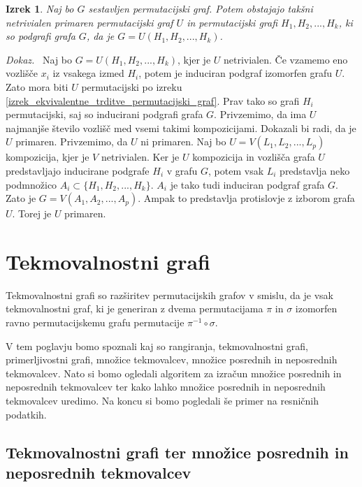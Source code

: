 \documentclass[a4paper, 12pt]{book}
\newtheorem{izrek}{Izrek}[chapter]
\newenvironment{dokaz}{\emph{Dokaz.}\ }{\hspace{\fill}{$\Box$}}
\begin{document}
\begin{izrek}
    Naj bo $G$ sestavljen permutacijski graf. Potem obstajajo takšni netrivialen primaren permutacijski graf $U$ in permutacijski grafi $H_1, H_2, ..., H_k$, ki so podgrafi grafa $G$, da je $G = U(H_1, H_2, ..., H_k)$.
\end{izrek}
\begin{dokaz}
    Naj bo $G = U(H_1, H_2, ..., H_k)$, kjer je $U$ netrivialen. Če vzamemo eno vozlišče $x_i$ iz vsakega izmed $H_i$, potem je induciran podgraf izomorfen grafu $U$. Zato mora biti $U$ permutacijski po izreku \ref{izrek_ekvivalentne_trditve_permutacijski_graf}. Prav tako so grafi $H_i$ permutacijski, saj so inducirani podgrafi grafa $G$. Privzemimo, da ima $U$ najmanjše število vozlišč med vsemi takimi kompozicijami. Dokazali bi radi, da je $U$ primaren. Privzemimo, da $U$ ni primaren. Naj bo $U = V(L_1, L_2, ..., L_p)$ kompozicija, kjer je $V$ netrivialen. Ker je $U$ kompozicija in vozlišča grafa $U$ predstavljajo inducirane podgrafe $H_i$ v grafu $G$, potem vsak $L_i$ predstavlja neko podmnožico $A_i \subset \{ H_1, H_2, ..., H_k \}$. $A_i$ je tako tudi induciran podgraf grafa $G$. Zato je $G = V(A_1, A_2, ..., A_p)$. Ampak to predstavlja protislovje z izborom grafa $U$. Torej je $U$ primaren.
\end{dokaz}

\chapter{ Tekmovalnostni grafi }

Tekmovalnostni grafi so razširitev permutacijskih grafov v smislu, da je vsak tekmovalnostni graf, ki je generiran z dvema permutacijama $\pi$ in $\sigma$ izomorfen ravno permutacijskemu grafu permutacije $\pi^{-1} \circ \sigma$. 

V tem poglavju bomo spoznali kaj so rangiranja, tekmovalnostni grafi, primerljivostni grafi, množice tekmovalcev, množice posrednih in neposrednih tekmovalcev. Nato si bomo ogledali algoritem za izračun množice posrednih in neposrednih tekmovalcev ter kako lahko množice posrednih in neposrednih tekmovalcev uredimo. Na koncu si bomo pogledali še primer na resničnih podatkih.

\section{ Tekmovalnostni grafi ter množice posrednih in neposrednih tekmovalcev }
\end{document}
